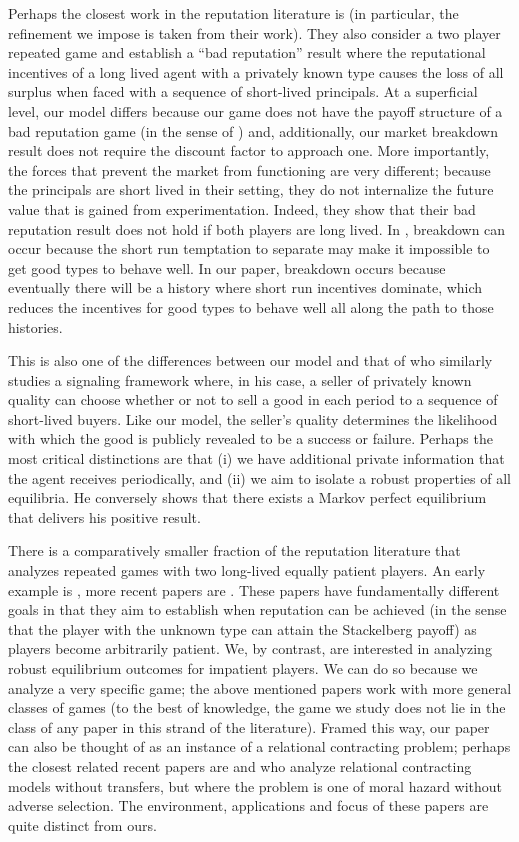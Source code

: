 \documentclass[11pt,reqno]{amsart}
\begin{document}
Perhaps the closest work in the reputation literature is \cite{ely2003} (in particular, the refinement we impose is taken from their work). They also consider a two player repeated game and establish a ``bad reputation'' result where the reputational incentives of a long lived agent with a privately known type causes the loss of all surplus when faced with a sequence of short-lived principals. At a superficial level, our model differs because our game does not have the payoff structure of a bad reputation game (in the sense of \cite{ely2008}) and, additionally, our market breakdown result does not require the discount factor to approach one. More importantly, the forces that prevent the market from functioning are very different; because the principals are short lived in their setting, they do not internalize the future value that is gained from experimentation. Indeed, they show that their bad reputation result does not hold if both players are long lived. In \cite{ely2008}, breakdown can occur because the short run temptation to separate may make it impossible to get good types to behave well. In our paper, breakdown occurs because eventually there will be a history where short run incentives dominate, which reduces the incentives for good types to behave well all along the path to those histories.

This is also one of the differences between our model and that of \citet{bar-isaac2003} who similarly studies a signaling framework where, in his case, a seller of privately known quality can choose whether or not to sell a good in each period to a sequence of short-lived buyers. Like our model, the seller's quality determines the likelihood with which the good is publicly revealed to be a success or failure. Perhaps the most critical distinctions are that (i) we have additional private information that the agent receives periodically, and (ii) we aim to isolate a robust properties of all equilibria. He conversely shows that there exists a Markov perfect equilibrium that delivers his positive result.

There is a comparatively smaller fraction of the reputation literature that analyzes repeated games with two long-lived equally patient players. An early example is \cite{cripps1997}, more recent papers are \cite{atakan2012,atakan2013}. These papers have fundamentally different goals in that they aim to establish when reputation can be achieved (in the sense that the player with the unknown type can attain the Stackelberg payoff) as players become arbitrarily patient. We, by contrast, are interested in analyzing robust equilibrium outcomes for impatient players. We can do so because we analyze a very specific game; the above mentioned papers work with more general classes of games (to the best of knowledge, the game we study does not lie in the class of any paper in this strand of the literature). Framed this way, our paper can also be thought of as an instance of a relational contracting problem; perhaps the closest related recent papers are \cite{li2017} and \cite{mitchell2017} who analyze relational contracting models without transfers, but where the problem is one of moral hazard without adverse selection. The environment, applications and focus of these papers are quite distinct from ours.
\end{document}
